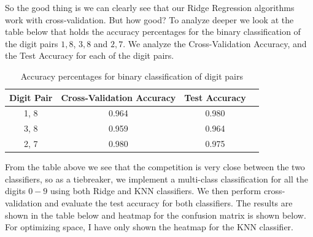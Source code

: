 \documentclass[11pt]{amsart}
\begin{document}
So the good thing is we can clearly see that our Ridge Regression algorithms work with cross-validation. But how good? To analyze deeper we look at the table below that holds the accuracy percentages for the binary classification of the digit pairs $1, 8$, $3, 8$ and $2, 7$. We analyze the Cross-Validation Accuracy, and the Test Accuracy for each of the digit pairs.

\begin{table}[H]
    \centering
    \begin{tabular}{|c|c|c|c|}
    \hline
    \textbf{Digit Pair} & \textbf{Cross-Validation Accuracy} & \textbf{Test Accuracy} \\ \hline
    1, 8               & 0.964                               & 0.980                  \\ \hline
    3, 8               & 0.959                               & 0.964                  \\ \hline
    2, 7               & 0.980                               & 0.975                  \\ \hline
    \end{tabular}
    \caption{Accuracy percentages for binary classification of digit pairs}
    \label{tab:binary_accuracy}
\end{table}

From the table above we see that the competition is very close between the two classifiers, so as a tiebreaker, we implement a multi-class classification for all the digits $0-9$ using both Ridge and KNN classifiers. We then perform cross-validation and evaluate the test accuracy for both classifiers. The results are shown in the table below and heatmap for the confusion matrix is shown below. For optimizing space, I have only shown the heatmap for the KNN classifier.
\end{document}

